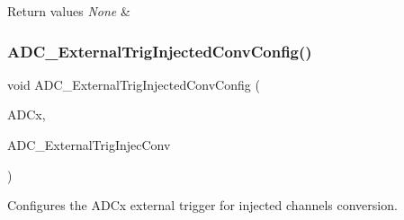 \begin{DoxyRetVals}{Return values}
{\em None} & \\
\hline
\end{DoxyRetVals}
\mbox{\label{group___a_d_c___exported___functions_gafc02ce1e84e96b692adf085f61a0bca6}} 
\subsubsection{\texorpdfstring{ADC\_ExternalTrigInjectedConvConfig()}{ADC\_ExternalTrigInjectedConvConfig()}}
{\footnotesize\ttfamily void A\+D\+C\+\_\+\+External\+Trig\+Injected\+Conv\+Config (\begin{DoxyParamCaption}\item[{\mbox{\hyperlink{struct_a_d_c___type_def}{A\+D\+C\+\_\+\+Type\+Def}} $\ast$}]{A\+D\+Cx,  }\item[{uint32\+\_\+t}]{A\+D\+C\+\_\+\+External\+Trig\+Injec\+Conv }\end{DoxyParamCaption})}



Configures the A\+D\+Cx external trigger for injected channels conversion. 


